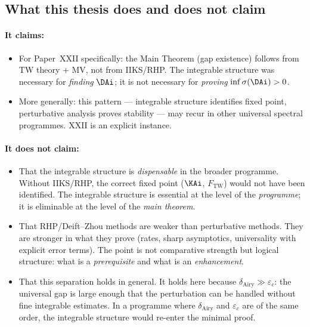 \documentclass[12pt,a4paper]{amsart}
\begin{document}
\subsection*{What this thesis does and does not claim}

\paragraph{It claims:}
\begin{itemize}
  \item For Paper~XXII specifically:
    the Main Theorem (gap existence) follows from TW theory + MV,
    not from IIKS/RHP.
    The integrable structure was necessary for \emph{finding} $\DAi$;
    it is not necessary for \emph{proving} $\inf\sigma(\DAi) > 0$.
  \item More generally: this pattern --- integrable structure identifies
    fixed point, perturbative analysis proves stability ---
    may recur in other universal spectral programmes.
    XXII is an explicit instance.
\end{itemize}

\paragraph{It does not claim:}
\begin{itemize}
  \item That the integrable structure is \emph{dispensable} in the
    broader programme.
    Without IIKS/RHP, the correct fixed point ($\KAi$, $F_{\mathrm{TW}}$)
    would not have been identified.
    The integrable structure is essential at the level of the
    \emph{programme}; it is eliminable at the level of the
    \emph{main theorem}.
  \item That RHP/Deift--Zhou methods are weaker than perturbative methods.
    They are stronger in what they prove (rates, sharp asymptotics,
    universality with explicit error terms).
    The point is not comparative strength but logical structure:
    what is a \emph{prerequisite} and what is an \emph{enhancement}.
  \item That this separation holds in general.
    It holds here because $\delta_{\mathrm{Airy}} \gg \varepsilon_c$:
    the universal gap is large enough that the perturbation can be
    handled without fine integrable estimates.
    In a programme where $\delta_{\mathrm{Airy}}$ and $\varepsilon_c$
    are of the same order, the integrable structure would re-enter
    the minimal proof.
\end{itemize}
\end{document}
